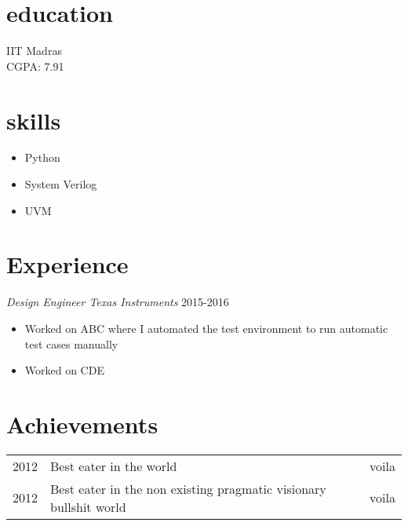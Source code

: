 \documentclass[line, margin]{res} %
\begin{document}

\begin{resume}

\section {education}
IIT Madras \\ %
CGPA: 7.91

\section {skills}
\begin{itemize}
\item Python
\item System Verilog
\item UVM
\end{itemize}


\section{Experience}
\textit{Design Engineer Texas Instruments} \hfill 2015-2016 \\
\begin{itemize}
\item Worked on ABC  where I automated the test environment to run automatic test cases manually
\item Worked on CDE 
\end{itemize}


\section {Achievements}
\begin{tabular}{l l r}
2012 & Best eater in the world & voila\\
2012 & Best eater in the non existing pragmatic visionary bullshit world & voila\\
\end{tabular}
\end{resume}
\end{document}

